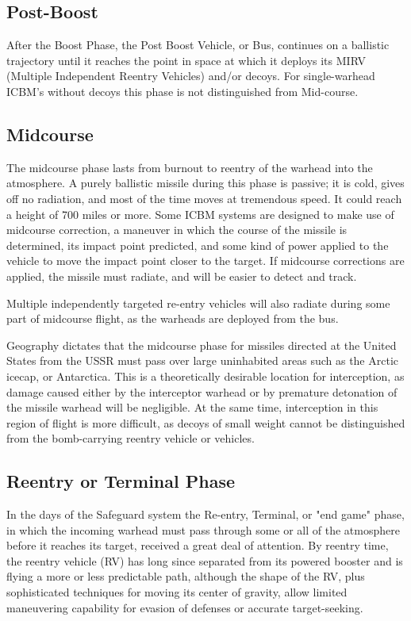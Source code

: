 \subsection{Post-Boost}
After the Boost Phase, the Post Boost Vehicle, or Bus, continues on a ballistic trajectory until it reaches the point in space at which it deploys its MIRV (Multiple Independent Reentry Vehicles) and/or decoys. For single-warhead ICBM's without decoys this phase is not distinguished from Mid-course.

\subsection{Midcourse}
The midcourse phase lasts from burnout to reentry of the warhead into the atmosphere. A purely ballistic missile during this phase is passive; it is cold, gives off no radiation, and most of the time moves at tremendous speed. It could reach a height of 700 miles or more. Some ICBM systems are designed to make use of midcourse correction, a maneuver in which the course of the missile is determined, its impact point predicted, and some kind of power applied to the vehicle to move the impact point closer to the target. If midcourse corrections are applied, the missile must radiate, and will be easier to detect and track.

Multiple independently targeted re-entry vehicles will also radiate during some part of midcourse flight, as the warheads are deployed from the bus.

Geography dictates that the midcourse phase for missiles directed at the United States from the USSR must pass over large uninhabited areas such as the Arctic icecap, or Antarctica. This is a theoretically desirable location for interception, as damage caused either by the interceptor warhead or by premature detonation of the missile warhead will be negligible. At the same time, interception in this region of flight is more difficult, as decoys of small weight cannot be distinguished from the bomb-carrying reentry vehicle or vehicles.

\subsection{Reentry or Terminal Phase}
In the days of the Safeguard system the Re-entry, Terminal, or "end game" phase, in which the incoming warhead must pass through some or all of the atmosphere before it reaches its target, received a great deal of attention. By reentry time, the reentry vehicle (RV) has long since separated from its powered booster and is flying a more or less predictable path, although the shape of the RV, plus sophisticated techniques for moving its center of gravity, allow limited maneuvering capability for evasion of defenses or accurate target-seeking.

